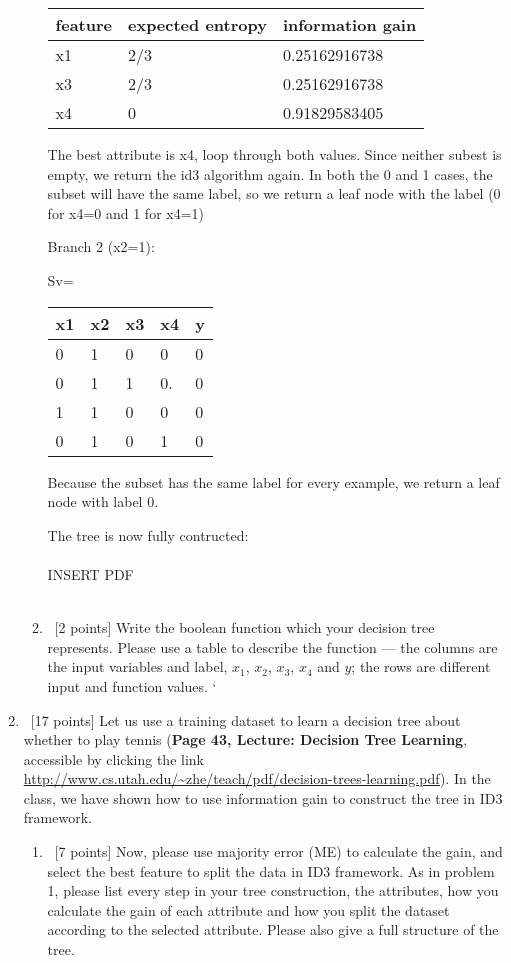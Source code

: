 \documentclass[12pt, fullpage,letterpaper]{article}
\begin{document}
\begin{enumerate}
\begin{enumerate}
	\begin{tabular}{|l|l|l|}
		\hline
		feature & expected entropy & information gain \\ \hline
		x1      & 2/3              & 0.25162916738    \\ \hline
		x3      & 2/3              & 0.25162916738    \\ \hline
		x4      & 0                & 0.91829583405    \\ \hline
		\end{tabular}

The best attribute is x4,  loop through both values. Since neither subest is empty, we return the id3 algorithm again. In both the 0 and 1 cases, the subset will have the same label, so we return a leaf node with the label (0 for x4=0 and 1 for x4=1)

Branch 2 (x2=1):

Sv=\begin{tabular}{|l|l|l|l|l|}
	\hline
	x1 & x2 & x3 & x4 & y \\ \hline
	0  & 1  & 0  & 0  & 0 \\ \hline
	0  & 1  & 1  & 0. & 0 \\ \hline
	1  & 1  & 0  & 0  & 0 \\ \hline
	0  & 1  & 0  & 1  & 0 \\ \hline
	\end{tabular}

Because the subset has the same label for every example, we return a leaf node with label 0.

The tree is now fully contructed:
\\\\
INSERT PDF
\\\\
\item~[2 points] Write the boolean function which your decision tree represents. Please use a table to describe the function --- the columns are the input variables and label, \ie $x_1$, $x_2$, $x_3$, $x_4$ and $y$; the rows are different input and  function values. 
`\end{enumerate}
\item~[17 points] Let us use a training dataset to learn a decision tree about whether to play tennis (\textbf{Page 43, Lecture: Decision Tree Learning}, accessible by clicking the link \href{http://www.cs.utah.edu/~zhe/teach/pdf/decision-trees-learning.pdf}{http://www.cs.utah.edu/\textasciitilde zhe/teach/pdf/decision-trees-learning.pdf}). In the class, we have shown how to use information gain to construct the tree in ID3 framework.  
\begin{enumerate}
	\item~[7 points] Now, please use majority error (ME) to calculate the gain, and select the best feature to split the data in ID3 framework. As in problem 1, please list every step in your tree construction,  the attributes,  how you calculate the gain of each attribute and how you split the dataset according to the selected attribute. Please also give a full structure of the tree.


\end{enumerate}
\end{enumerate}
\end{document}
